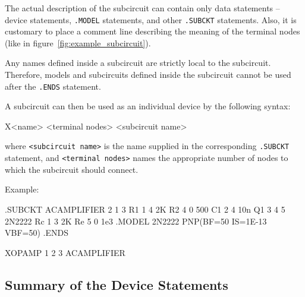 The actual description of the subcircuit can contain only data statements -- device statements, \texttt{.MODEL} statements, and other \texttt{.SUBCKT} statements. Also, it is customary to place a comment line describing the meaning of the terminal nodes (like in figure~\ref{fig:example_subcircuit}).

Any names defined inside a subcircuit are strictly local to the subcircuit. Therefore, models and subcircuits defined inside the subcircuit cannot be used after the \texttt{.ENDS} statement.

A subcircuit can then be used as an individual device by the following syntax:

\begin{code}
X<name> <terminal nodes> <subcircuit name>
\end{code}

where \texttt{<subcircuit name>} is the name supplied in the corresponding \texttt{.SUBCKT} statement, and \texttt{<terminal nodes>} names the appropriate number of nodes to which the subcircuit should connect.

Example:
\begin{code}
.SUBCKT ACAMPLIFIER 2 1 3
R1 1 4 2K
R2 4 0 500
C1 2 4 10n
Q1 3 4 5 2N2222
Rc 1 3 2K
Re 5 0 1e3
.MODEL 2N2222 PNP(BF=50 IS=1E-13 VBF=50)
.ENDS

XOPAMP 1 2 3 ACAMPLIFIER
\end{code}

\subsection{Summary of the Device Statements}

